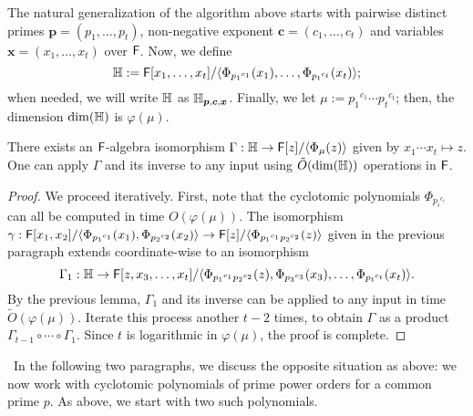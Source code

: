   The natural
generalization of the algorithm above starts with pairwise distinct
primes $\boldsymbol{p}=(p_1,\dots,p_t)$, non-negative exponent
$\boldsymbol{c}=(c_1,\dots,c_t)$ and variables
$\boldsymbol{x}=(x_1,\dots,x_t)$ over ${\mathsf{F}}$. Now, we define
$$\mathbb{H}:={\mathsf{F}}[x_1,\dots,x_t]/\langle
\Phi_{{p_1}^{c_1}}(x_1),\dots,\Phi_{{p_t}^{c_t}}(x_t)\rangle;$$ when
needed, we will write $\mathbb{H}$ as
$\mathbb{H}_{\boldsymbol{p},\boldsymbol{c},\boldsymbol{x}}$. Finally, we let
$\mu:={p_1}^{c_1}\cdots {p_t}^{c_t}$; then, the dimension $\dim(\mathbb{H})$ is
$\varphi(\mu)$.

\begin{lemma}\label{lemma:distinctP}
 There exists an ${\mathsf{F}}$-algebra isomorphism $\Gamma: \mathbb{H} \to
 {\mathsf{F}}[z]/\langle\Phi_{\mu}(z)\rangle$ given by $x_1 \cdots x_t \mapsto
 z$.  One can apply $\Gamma$ and its inverse to any input using
 $\tilde{O}(\dim(\mathbb{H}))$ operations in ${\mathsf{F}}$.
\end{lemma}
\begin{proof}
  We proceed iteratively. First, note that the cyclotomic polynomials
  $\Phi_{{p_i}^{c_i}}$ can all be computed in time $O(\varphi(\mu))$. 
  The isomorphism
  $\gamma: {\mathsf{F}}[x_1,x_2]/\langle \Phi_{{p_1}^{c_1}}(x_1),
  \Phi_{{p_2}^{c_2}}(x_2)\rangle \to {\mathsf{F}}[z]/\langle
  \Phi_{{p_1}^{c_1}{p_2}^{c_2}}(z)\rangle$
given in the previous paragraph extends coordinate-wise to an
  isomorphism
  $$\Gamma_1: \mathbb{H} \to {\mathsf{F}}[z,x_3,\dots,x_t]/\langle
  \Phi_{{p_1}^{c_1}{p_2}^{c_2}}(z),\Phi_{{p_3}^{c_3}}(x_3),\dots,\Phi_{{p_t}^{c_t}}(x_t)\rangle.$$
  By the previous lemma, $\Gamma_1$ and its inverse can be applied to
  any input in time $\tilde{O}(\varphi(\mu))$. Iterate this process
  another $t-2$ times, to obtain $\Gamma$ as a product
  $\Gamma_{t-1} \circ \cdots \circ \Gamma_1$. Since $t$ is logarithmic 
  in $\varphi(\mu)$, the proof is complete.
\end{proof}

~In the following two paragraphs, we discuss the opposite situation as
above: we now work with cyclotomic polynomials of prime power
orders for a common prime $p$. As above, we start with two such polynomials.

